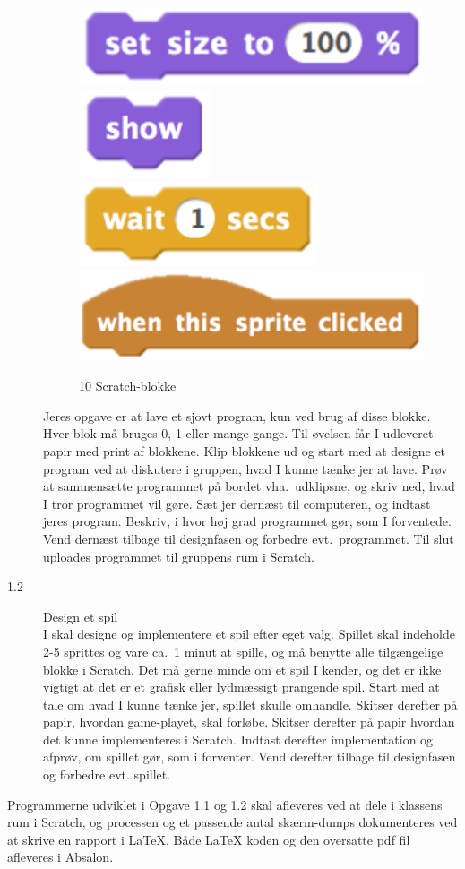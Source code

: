 \documentclass[a4paper,12pt]{article}
\begin{document}
\begin{description}
\begin{figure}
    \includegraphics[height=0.05\paperheight]{setSize.png}
    \includegraphics[height=0.05\paperheight]{show.png}
    \includegraphics[height=0.05\paperheight]{wait.png}
    \includegraphics[height=0.07\paperheight]{when.png}
    \caption{10 Scratch-blokke}
    \label{fig:blokke}
  \end{figure}
Jeres opgave er at
  lave et sjovt program, kun ved brug af disse blokke. Hver blok må
  bruges 0, 1 eller mange gange. Til øvelsen får I udleveret papir med
  print af blokkene. Klip blokkene ud og start med at designe et
  program ved at diskutere i gruppen, hvad I kunne tænke jer at
  lave. Prøv at sammensætte programmet på bordet vha.\ udklipsne, og
  skriv ned, hvad I tror programmet vil gøre. Sæt jer dernæst til
  computeren, og indtast jeres program. Beskriv, i hvor høj grad
  programmet gør, som I forventede. Vend dernæst tilbage til
  designfasen og forbedre evt.\ programmet. Til slut uploades
  programmet til gruppens rum i Scratch.
\item[1.2] Design et spil\\
  I skal designe og implementere et spil efter eget valg. Spillet skal
  indeholde 2-5 sprittes og vare ca.\ 1 minut at spille, og må benytte
  alle tilgængelige blokke i Scratch. Det må gerne
  minde om et spil I kender, og det er ikke vigtigt at det er et
  grafisk eller lydmæssigt prangende spil. Start med at tale om hvad I
  kunne tænke jer, spillet skulle omhandle. Skitser derefter på papir,
  hvordan game-playet, skal forløbe. Skitser derefter på papir hvordan
  det kunne implementeres i Scratch. Indtast derefter implementation
  og afprøv, om spillet gør, som i forventer. Vend derefter tilbage
  til designfasen og forbedre evt. spillet.
\end{description}
Programmerne udviklet i Opgave 1.1 og 1.2 skal afleveres ved at dele i
klassens rum i Scratch, og processen og et passende antal skærm-dumps
dokumenteres ved at skrive en rapport i LaTeX. Både LaTeX koden og den
oversatte pdf fil afleveres i Absalon.
\end{document}
